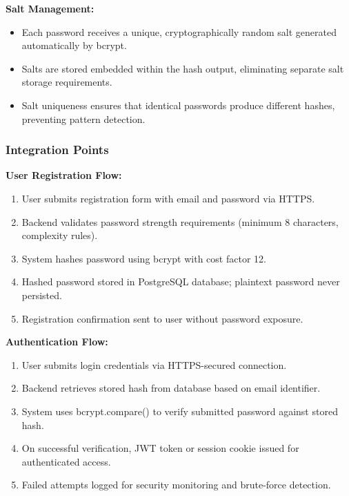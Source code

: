 \documentclass[12pt,a4paper]{article}
\begin{document}
\begin{tcolorbox}[colback=primaryblue!5, colframe=primaryblue, boxrule=1pt, arc=3pt, left=10pt, right=10pt, top=8pt, bottom=8pt]
\vspace{0.5em}

\textbf{Salt Management:}

\begin{itemize}[leftmargin=2em, itemsep=6pt]
    \item Each password receives a unique, cryptographically random salt generated automatically by bcrypt.
    \item Salts are stored embedded within the hash output, eliminating separate salt storage requirements.
    \item Salt uniqueness ensures that identical passwords produce different hashes, preventing pattern detection.
\end{itemize}

\subsubsection{Integration Points}

\textbf{User Registration Flow:}

\begin{enumerate}[leftmargin=2em, itemsep=6pt]
    \item User submits registration form with email and password via HTTPS.
    \item Backend validates password strength requirements (minimum 8 characters, complexity rules).
    \item System hashes password using bcrypt with cost factor 12.
    \item Hashed password stored in PostgreSQL database; plaintext password never persisted.
    \item Registration confirmation sent to user without password exposure.
\end{enumerate}

\vspace{0.5em}

\textbf{Authentication Flow:}

\begin{enumerate}[leftmargin=2em, itemsep=6pt]
    \item User submits login credentials via HTTPS-secured connection.
    \item Backend retrieves stored hash from database based on email identifier.
    \item System uses bcrypt.compare() to verify submitted password against stored hash.
    \item On successful verification, JWT token or session cookie issued for authenticated access.
    \item Failed attempts logged for security monitoring and brute-force detection.
\end{enumerate}


\end{tcolorbox}
\end{document}
